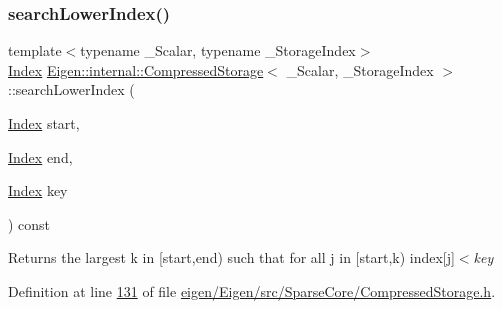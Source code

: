 \subsubsection{\texorpdfstring{search\+Lower\+Index()}{searchLowerIndex()}\hspace{0.1cm}{\footnotesize\ttfamily [3/4]}}
{\footnotesize\ttfamily template$<$typename \+\_\+\+Scalar, typename \+\_\+\+Storage\+Index$>$ \\
\hyperlink{namespace_eigen_a62e77e0933482dafde8fe197d9a2cfde}{Index} \hyperlink{class_eigen_1_1internal_1_1_compressed_storage}{Eigen\+::internal\+::\+Compressed\+Storage}$<$ \+\_\+\+Scalar, \+\_\+\+Storage\+Index $>$\+::search\+Lower\+Index (\begin{DoxyParamCaption}\item[{\hyperlink{namespace_eigen_a62e77e0933482dafde8fe197d9a2cfde}{Index}}]{start,  }\item[{\hyperlink{namespace_eigen_a62e77e0933482dafde8fe197d9a2cfde}{Index}}]{end,  }\item[{\hyperlink{namespace_eigen_a62e77e0933482dafde8fe197d9a2cfde}{Index}}]{key }\end{DoxyParamCaption}) const\hspace{0.3cm}{\ttfamily [inline]}}

\begin{DoxyReturn}{Returns}
the largest {\ttfamily k} in \mbox{[}start,end) such that for all {\ttfamily j} in \mbox{[}start,k) index\mbox{[}{\ttfamily j}\mbox{]}$<${\itshape key} 
\end{DoxyReturn}


Definition at line \hyperlink{eigen_2_eigen_2src_2_sparse_core_2_compressed_storage_8h_source_l00131}{131} of file \hyperlink{eigen_2_eigen_2src_2_sparse_core_2_compressed_storage_8h_source}{eigen/\+Eigen/src/\+Sparse\+Core/\+Compressed\+Storage.\+h}.

\mbox{\label{class_eigen_1_1internal_1_1_compressed_storage_a250b3282557fc6da7cf505f93ab5ad59}} 
